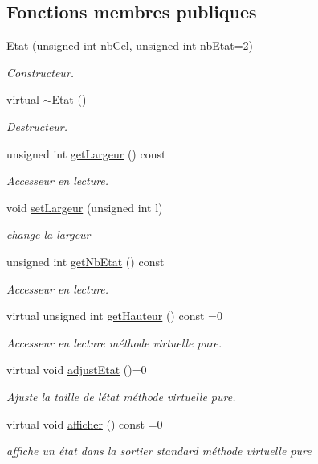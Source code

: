 \subsection*{Fonctions membres publiques}
\begin{DoxyCompactItemize}
\item 
\hyperlink{class_etat_a78a5538e285af98cc010c0a197b14d50}{Etat} (unsigned int nb\+Cel, unsigned int nb\+Etat=2)
\begin{DoxyCompactList}\small\item\em Constructeur. \end{DoxyCompactList}\item 
virtual \hyperlink{class_etat_a00bde3e769da5523e194a780ca95f7f7}{$\sim$\+Etat} ()
\begin{DoxyCompactList}\small\item\em Destructeur. \end{DoxyCompactList}\item 
unsigned int \hyperlink{class_etat_ad7822bc39dbe59ce5123bebcecb5c311}{get\+Largeur} () const 
\begin{DoxyCompactList}\small\item\em Accesseur en lecture. \end{DoxyCompactList}\item 
void \hyperlink{class_etat_a42eb8dc32d9865c25ff34f011d2c2706}{set\+Largeur} (unsigned int l)
\begin{DoxyCompactList}\small\item\em change la largeur \end{DoxyCompactList}\item 
unsigned int \hyperlink{class_etat_a9d4366197c4c39da8dd77929c4ca9621}{get\+Nb\+Etat} () const 
\begin{DoxyCompactList}\small\item\em Accesseur en lecture. \end{DoxyCompactList}\item 
virtual unsigned int \hyperlink{class_etat_aa2eeed5ffbef3b53a149385f81bf2af0}{get\+Hauteur} () const =0
\begin{DoxyCompactList}\small\item\em Accesseur en lecture méthode virtuelle pure. \end{DoxyCompactList}\item 
virtual void \hyperlink{class_etat_ac29c6d30fc8c982ff5f67eab6fc396de}{adjust\+Etat} ()=0
\begin{DoxyCompactList}\small\item\em Ajuste la taille de l\textquotesingle{}état méthode virtuelle pure. \end{DoxyCompactList}\item 
virtual void \hyperlink{class_etat_a796cef1d7607e3d185bec0a31eb7a819}{afficher} () const =0
\begin{DoxyCompactList}\small\item\em affiche un état dans la sortier standard méthode virtuelle pure \end{DoxyCompactList}\end{DoxyCompactItemize}
